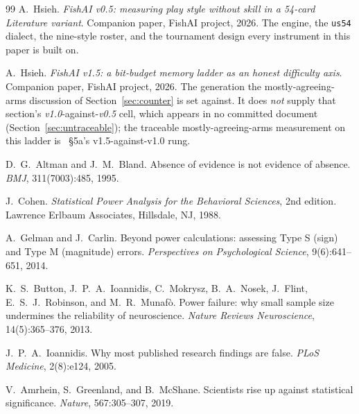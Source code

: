 \documentclass[11pt]{article}
\newcommand{\code}[1]{\texttt{#1}}
\newcommand{\usff}{\code{us54}}
\begin{document}
\begin{thebibliography}{99}
A.~Hsieh.
\emph{FishAI v0.5: measuring play style without skill in a 54-card Literature variant}.
Companion paper, FishAI project, 2026. The engine, the \usff{} dialect, the nine-style roster, and
the tournament design every instrument in this paper is built on.

A.~Hsieh.
\emph{FishAI v1.5: a bit-budget memory ladder as an honest difficulty axis}.
Companion paper, FishAI project, 2026. The generation the mostly-agreeing-arms discussion of
Section~\ref{sec:counter} is set against. It does \emph{not} supply that section's
\emph{v1.0}-against-\emph{v0.5} cell, which appears in no committed document
(Section~\ref{sec:untraceable}); the traceable mostly-agreeing-arms measurement on this ladder is
\cite{bounded}~\S5a's v1.5-against-v1.0 rung.

D.~G.~Altman and J.~M.~Bland.
Absence of evidence is not evidence of absence.
\emph{BMJ}, 311(7003):485, 1995.

J.~Cohen.
\emph{Statistical Power Analysis for the Behavioral Sciences}, 2nd edition.
Lawrence Erlbaum Associates, Hillsdale, NJ, 1988.

A.~Gelman and J.~Carlin.
Beyond power calculations: assessing Type S (sign) and Type M (magnitude) errors.
\emph{Perspectives on Psychological Science}, 9(6):641--651, 2014.

K.~S.~Button, J.~P.~A.~Ioannidis, C.~Mokrysz, B.~A.~Nosek, J.~Flint, E.~S.~J.~Robinson, and
M.~R.~Munaf\`o.
Power failure: why small sample size undermines the reliability of neuroscience.
\emph{Nature Reviews Neuroscience}, 14(5):365--376, 2013.

J.~P.~A.~Ioannidis.
Why most published research findings are false.
\emph{PLoS Medicine}, 2(8):e124, 2005.

V.~Amrhein, S.~Greenland, and B.~McShane.
Scientists rise up against statistical significance.
\emph{Nature}, 567:305--307, 2019.

\end{thebibliography}
\end{document}
